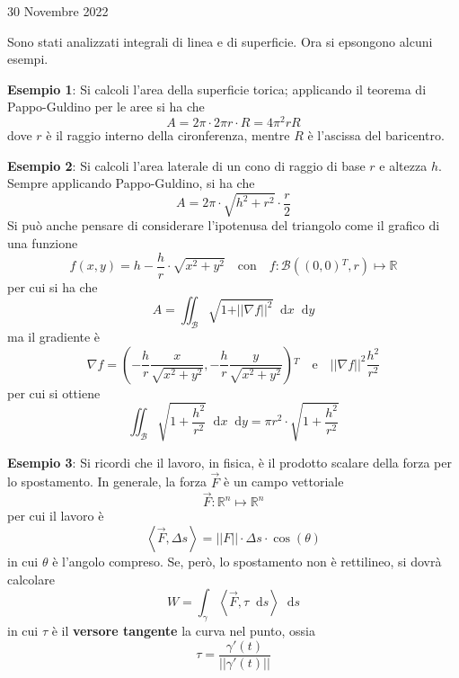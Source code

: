 \documentclass[a4paper]{extarticle}
\newcommand*\dif{\mathop{}\!\mathrm{d}}
\begin{document}
\newpage
\noindent
\begin{center}
    30 Novembre 2022
\end{center}
\vspace{1em}
\noindent
Sono stati analizzati integrali di linea e di superficie. Ora si epsongono alcuni esempi.

\vspace{2em}
\noindent
\textbf{Esempio 1}: Si calcoli l'area della superficie torica; applicando il teorema di Pappo-Guldino per le aree si ha che
\[A= 2\pi \cdot 2\pi r \cdot R = 4 \pi^2 r R\]
dove $r$ è il raggio interno della cironferenza, mentre $R$ è l'ascissa del baricentro.

\vspace{2em}
\noindent
\textbf{Esempio 2}: Si calcoli l'area laterale di un cono di raggio di base $r$ e altezza $h$.\\
Sempre applicando Pappo-Guldino, si ha che
\[A=2\pi \cdot \sqrt{h^2+r^2} \cdot \dfrac{r}{2}\]
Si può anche pensare di considerare l'ipotenusa del triangolo come il grafico di una funzione
\[f(x,y)=h-\dfrac{h}{r} \cdot \sqrt{x^2+y^2} \hspace{1em} \text{con} \hspace{1em} f : \mathcal{B}((0,0){^T},r) \longmapsto \mathbb{R}\]
per cui si ha che
\[A=\iint_\mathcal{B} \sqrt{1+\vert\vert\nabla f\vert\vert^2} \dif x \dif y\]
ma il gradiente è
\[\nabla f = \left(-\dfrac{h}{r} \dfrac{x}{\sqrt{x^2+y^2}}, - \dfrac{h}{r} \dfrac{y}{\sqrt{x^2+y^2}}\right){^T} \hspace{1em} \text{e} \hspace{1em} \vert\vert \nabla f \vert \vert^2 \dfrac{h^2}{r^2}\]
per cui si ottiene
\[\iint_\mathcal{B} \sqrt{1+\dfrac{h^2}{r^2}} \dif x \dif y = \pi r^2 \cdot \sqrt{1+\dfrac{h^2}{r^2}}\]

\vspace{2em}
\noindent
\textbf{Esempio 3}: Si ricordi che il lavoro, in fisica, è il prodotto scalare della forza per lo spostamento. In generale, la forza $\vec F$ è un campo vettoriale
\[\vec F : \mathbb{R}^n \longmapsto \mathbb{R}^n\]
per cui il lavoro è
\[\left<\vec F, \Delta s\right> = \vert\vert F \vert\vert \cdot \Delta s \cdot \cos(\theta)\]
in cui $\theta$ è l'angolo compreso. Se, però, lo spostamento non è rettilineo, si dovrà calcolare
\[W = \int_\gamma \left<\vec F, \tau\dif s\right> \dif s\]
in cui $\tau$ è il \textbf{versore tangente} la curva nel punto, ossia
\[\tau=\frac{\gamma'(t)}{\vert\vert \gamma'(t) \vert\vert}\]

\vspace{1em}
\end{document}
